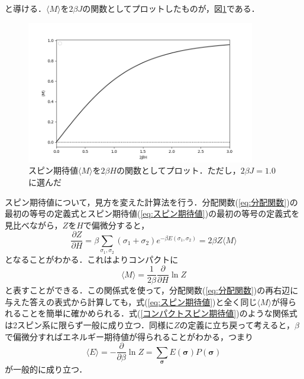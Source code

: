 \documentclass[a4paper,11pt]{jsarticle}
\begin{document}
と導ける．$\langle M \rangle$を$2\beta J$の関数としてプロットしたものが，図\ref{fig:spin_graph}である．\par
\begin{figure}[htbp]
  \begin{center}
    \includegraphics[width=100mm]{graph/fukushima(3_140).png}
    \caption{スピン期待値$\langle M \rangle$を$2\beta H$の関数としてプロット．ただし，$2\beta J = 1.0$に選んだ \label{fig:spin_graph} }
  \end{center}
\end{figure}

スピン期待値について，見方を変えた計算法を行う．分配関数(\ref{eq:分配関数})の最初の等号の定義式とスピン期待値(\ref{eq:スピン期待値})の最初の等号の定義式を見比べながら，$Z$を$H$で偏微分すると，
\begin{equation}
  \frac{\partial Z}{\partial H} = \beta \sum_{\sigma_1, \sigma_2}(\sigma_1 + \sigma_2)e^{-\beta E(\sigma_1, \sigma_2)} = 2\beta Z \langle M \rangle
\end{equation}
となることがわかる．これはよりコンパクトに
\begin{equation}
  \langle M \rangle = \frac{1}{2\beta} \frac{\partial}{\partial H} \ln{Z} \label{eq:コンパクトスピン期待値}
\end{equation}
と表すことができる．この関係式を使って，分配関数(\ref{eq:分配関数})の再右辺に与えた答えの表式から計算しても，式(\ref{eq:スピン期待値})と全く同じ$\langle M \rangle$が得られることを簡単に確かめられる．式(\ref{コンパクトスピン期待値})のような関係式は2スピン系に限らず一般に成り立つ．同様に$Z$の定義に立ち戻って考えると，$\beta$で偏微分すればエネルギー期待値が得られることがわかる，つまり
\begin{equation}
  \langle E \rangle = -\frac{\partial}{\partial \beta} \ln{Z} = \sum_{\bm{\sigma}} E(\bm{\sigma}) P(\bm{\sigma})
\end{equation}
が一般的に成り立つ．
\end{document}
